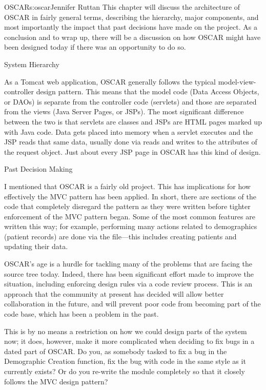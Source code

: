 \begin{aosachapter}{OSCAR}{s:oscar}{Jennifer Ruttan}
This chapter will discuss the architecture of OSCAR in fairly general
terms, describing the hierarchy, major components, and most
importantly the impact that past decisions have made on the
project. As a conclusion and to wrap up, there will be a discussion on
how OSCAR might have been designed today if there was an opportunity to do so.

\begin{aosasect1}{System Hierarchy}

As a Tomcat web application, OSCAR generally follows the typical
model-view-controller design pattern. This means that the model code
(Data Access Objects, or DAOs) is separate from the controller code
(servlets) and those are separated from the views (Java Server Pages,
or JSPs). The most significant difference between the two is that
servlets are classes and JSPs are HTML pages marked up with Java
code. Data gets placed into memory when a servlet executes and the JSP
reads that same data, usually done via reads and writes to the
attributes of the request object. Just about every JSP page in OSCAR
has this kind of design.

\end{aosasect1}

\begin{aosasect1}{Past Decision Making}

I mentioned that OSCAR is a fairly old project. This has implications
for how effectively the MVC pattern has been applied. In short, there
are sections of the code that completely disregard the pattern as they
were written before tighter enforcement of the MVC pattern began. Some
of the most common features are written this way; for example,
performing many actions related to demographics (patient records) are
done via the  file---this includes
creating patients and updating their data.

OSCAR's age is a hurdle for tackling many of the problems that are
facing the source tree today. Indeed, there has been significant
effort made to improve the situation, including enforcing design rules
via a code review process. This is an approach that the community at
present has decided will allow better collaboration in the future, and
will prevent poor code from becoming part of the code base, which has
been a problem in the past.

This is by no means a restriction on how we could design parts of the
system now; it does, however, make it more complicated when deciding
to fix bugs in a dated part of OSCAR. Do you, as somebody tasked to
fix a bug in the Demographic Creation function, fix the bug with code
in the same style as it currently exists? Or do you re-write the
module completely so that it closely follows the MVC design pattern?


\end{aosasect1}
\end{aosachapter}
